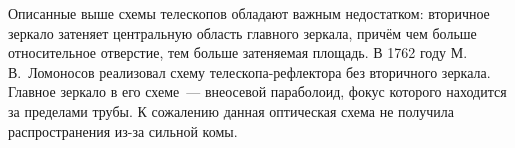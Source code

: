 Описанные выше схемы телескопов обладают важным недостатком: вторичное зеркало затеняет центральную область главного зеркала, причём чем больше относительное отверстие, тем больше затеняемая площадь. В 1762 году М.\,В.~Ломоносов реализовал схему телескопа-реф\-лек\-тора без вторичного зеркала. Главное зеркало в его схеме~--- внеосевой параболоид, фокус которого находится за пределами трубы. К сожалению данная оптическая схема не получила распространения из-за сильной комы.



